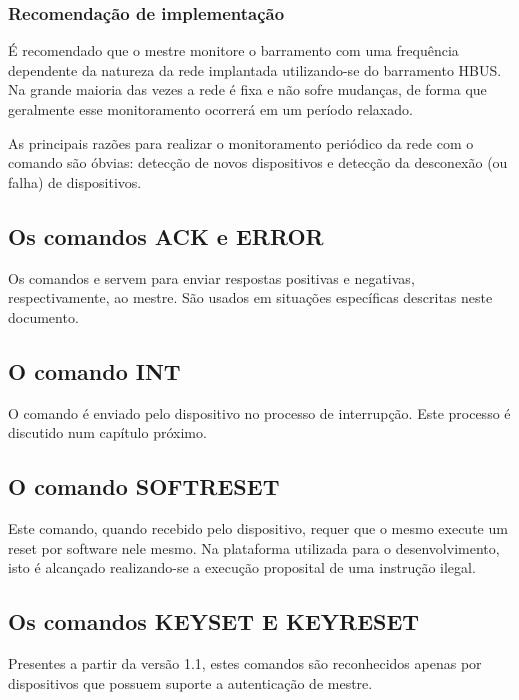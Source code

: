 \documentclass[11pt]{report}
\begin{document}
\subsubsection{Recomendação de implementação}

É recomendado que o mestre monitore o barramento com uma frequência dependente da natureza da rede implantada utilizando-se do barramento HBUS. Na grande maioria das vezes a rede é fixa e não sofre mudanças, de forma que geralmente esse monitoramento ocorrerá em um período relaxado.

As principais razões para realizar o monitoramento periódico da rede com o comando  são óbvias:
detecção de novos dispositivos e detecção da desconexão (ou falha) de dispositivos.

\subsection{Os comandos ACK e ERROR}

Os comandos  e  servem para enviar respostas positivas e negativas, respectivamente, ao mestre. São usados em situações específicas descritas neste documento.

\subsection{O comando INT}

O comando  é enviado pelo dispositivo no processo de interrupção. Este processo é discutido num capítulo próximo.

\subsection{O comando SOFTRESET}

Este comando, quando recebido pelo dispositivo, requer que o mesmo execute um reset por software nele mesmo.
Na plataforma utilizada para o desenvolvimento, isto é alcançado realizando-se a execução proposital de uma instrução ilegal.

\subsection{Os comandos KEYSET E KEYRESET}

Presentes a partir da versão 1.1, estes comandos são reconhecidos apenas por dispositivos que possuem suporte a autenticação de mestre.
\end{document}

